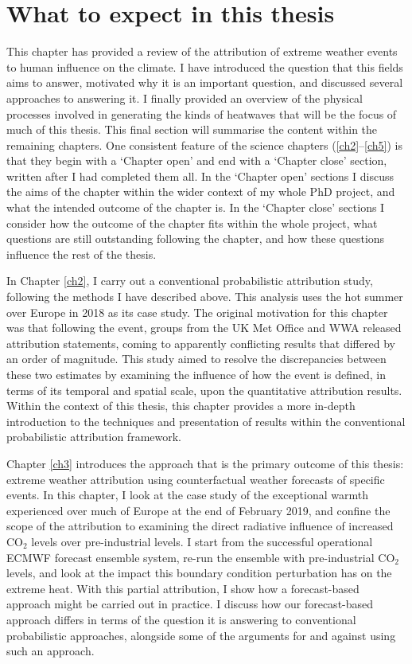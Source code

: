 \section{What to expect in this thesis}

  This chapter has provided a review of the attribution of extreme weather events to human influence on the climate. I have introduced the question that this fields aims to answer, motivated why it is an important question, and discussed several approaches to answering it. I finally provided an overview of the physical processes involved in generating the kinds of heatwaves that will be the focus of much of this thesis. This final section will summarise the content within the remaining chapters. One consistent feature of the science chapters (\ref{ch2}--\ref{ch5}) is that they begin with a `Chapter open' and end with a `Chapter close' section, written after I had completed them all. In the `Chapter open' sections I discuss the aims of the chapter within the wider context of my whole PhD project, and what the intended outcome of the chapter is. In the `Chapter close' sections I consider how the outcome of the chapter fits within the whole project, what questions are still outstanding following the chapter, and how these questions influence the rest of the thesis.

  In Chapter \ref{ch2}, I carry out a conventional probabilistic attribution study, following the methods I have described above. This analysis uses the hot summer over Europe in 2018 as its case study. The original motivation for this chapter was that following the event, groups from the UK Met Office and WWA released attribution statements, coming to apparently conflicting results that differed by an order of magnitude. This study aimed to resolve the discrepancies between these two estimates by examining the influence of how the event is defined, in terms of its temporal and spatial scale, upon the quantitative attribution results. Within the context of this thesis, this chapter provides a more in-depth introduction to the techniques and presentation of results within the conventional probabilistic attribution framework.

  Chapter \ref{ch3} introduces the approach that is the primary outcome of this thesis: extreme weather attribution using counterfactual weather forecasts of specific events. In this chapter, I look at the case study of the exceptional warmth experienced over much of Europe at the end of February 2019, and confine the scope of the attribution to examining the direct radiative influence of increased CO$_2$ levels over pre-industrial levels. I start from the successful operational ECMWF forecast ensemble system, re-run the ensemble with pre-industrial CO$_2$ levels, and look at the impact this boundary condition perturbation has on the extreme heat. With this partial attribution, I show how a forecast-based approach might be carried out in practice. I discuss how our forecast-based approach differs in terms of the question it is answering to conventional probabilistic approaches, alongside some of the arguments for and against using such an approach.

